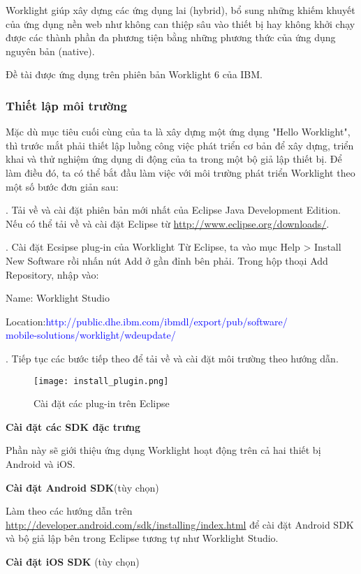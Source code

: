 Worklight giúp xây dựng các ứng dụng lai (hybrid), bổ sung những khiếm khuyết của ứng dụng nền web như không can thiệp sâu vào thiết bị hay không khởi chạy được các thành phần đa phương tiện bằng những phương thức của ứng dụng nguyên bản (native).

Đề tài được ứng dụng trên phiên bản Worklight 6 của IBM.

\subsubsection{Thiết lập môi trường}

Mặc dù mục tiêu cuối cùng của ta là xây dựng một ứng dụng "Hello Worklight", thì trước mắt phải thiết lập luồng công việc phát triển cơ bản để xây dựng, triển khai và thử nghiệm ứng dụng di động của ta trong một bộ giả lập thiết bị. Để làm điều đó, ta có thể bắt đầu làm việc với môi trường phát triển Worklight theo một số bước đơn giản sau:

. Tải về và cài đặt phiên bản mới nhất của Eclipse Java Development Edition. Nếu có thể tải về và cài đặt Eclipse từ \url{http://www.eclipse.org/downloads/}.

. Cài đặt Ecsipse plug-in của Worklight
Từ Eclipse, ta vào mục Help > Install New Software rồi nhấn nút Add ở gần đỉnh bên phải. Trong hộp thoại Add Repository, nhập vào:

\quad Name: Worklight Studio

\quad Location:\textcolor{blue}{http://public.dhe.ibm.com/ibmdl/export/pub/software/\\mobile-solutions/worklight/wdeupdate/}

. Tiếp tục các bước tiếp theo để tải về và cài đặt môi trường theo hướng dẫn.
 \begin{figure}[!htb] 
 \centering
 \texttt{[image: install\_plugin.png]}
 \caption{Cài đặt các plug-in trên Eclipse}
 \end{figure}
 \newpage
 
\textbf{Cài đặt các SDK đặc trưng}

 Phần này sẽ giới thiệu ứng dụng Worklight hoạt động trên cả hai thiết bị Android và iOS.
 
 \textbf{Cài đặt Android SDK}(tùy chọn)
 
 Làm theo các hướng dẫn trên \url{http://developer.android.com/sdk/installing/index.html} để cài đặt Android SDK và bộ giả lập bên trong Eclipse tương tự như Worklight Studio.
 
 \textbf{Cài đặt iOS SDK} (tùy chọn)
 
